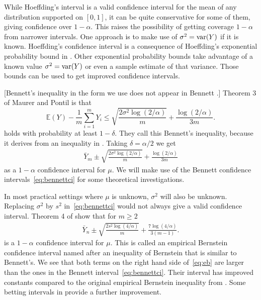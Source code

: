\documentclass{article}
\newcommand{\art}[1]{\begingroup\color{blue}#1\endgroup}
\renewcommand{\le}{\leqslant}
\renewcommand{\ge}{\geqslant}
\newcommand{\e}{\mathbb{E}}
\begin{document}
While Hoeffding's interval is a valid confidence interval
for the mean of any distribution supported on $[0,1]$,
it can be quite conservative for some
of them, giving confidence over $1-\alpha$. This raises
the possibility of getting coverage $1-\alpha$ from
narrower intervals.  
One approach is to make use of 
$\sigma^2=\operatorname{var}(Y)$ if it is known. 
Hoeffding's confidence interval is a consequence of
Hoeffding's exponential probability bound in \cite{hoef:1963}.
Other exponential probability bounds take advantage of
a known value $\sigma^2=\operatorname{var}(Y)$ or even a sample estimate
of that variance.  Those bounds can be used to get
improved confidence intervals.

\art{[Bennett's inequality in the form we use
does not appear in Bennett \cite{benn:1962}.]
Theorem 3 of Maurer and Pontil \cite{maurer2009empirical}
is that
$$
\e(Y) - \frac1m\sum_{i=1}^mY_i \le \sqrt{\frac{2\sigma^2\log(2/\alpha)}m}
+ \frac{\log(2/\alpha)}{3m}.
  $$
holds with probability at least $1-\delta$.
They call this Bennett's inequality, because it derives
from an inequality in \cite{benn:1962}.}
Taking $\delta =\alpha/2$ we get
\begin{align}\label{eq:bennettci}
\bar Y_m \pm \sqrt{\frac{2\sigma^2\log(2/\alpha)}m}
+ \frac{\log(2/\alpha)}{3m}
\end{align}
as a $1-\alpha$ confidence interval for $\mu$.
We will make use of the Bennett confidence
intervals~\eqref{eq:bennettci} for some
theoretical investigations. 

In most practical settings where $\mu$ is unknown,
$\sigma^2$ will also be unknown. Replacing $\sigma^2$
by $s^2$ in~\eqref{eq:bennettci} would not always
give a valid confidence interval.  
Theorem 4 of \cite{maurer2009empirical} show that
for $m\ge2$
\begin{align}\label{eq:eb}
    \bar Y_n\pm
\sqrt{\frac{2s^2\log(4/\alpha)}m}
+ \frac{7\log(4/\alpha)}{3(m-1)}.
\end{align}
is a $1-\alpha$ confidence interval for $\mu$.
This is called an empirical Bernstein confidence
interval named after an inequality of Bernstein
that is similar to Bennett's.  We see that both terms
on the right hand side of~\eqref{eq:eb} are larger
than the ones in the Bennett interval~\eqref{eq:bennettci}.
Their interval has improved constants compared to the original
empirical Bernstein inequality from
\cite{audi:muno:szep:2007}. Some betting intervals
in \cite{WauRam24a} provide a further improvement.



\end{document}
